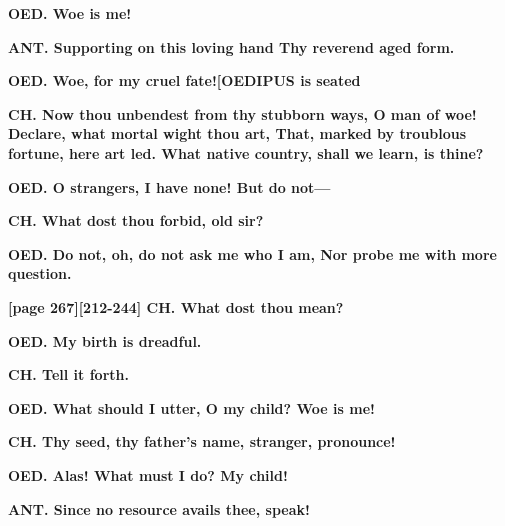 \documentclass[11pt,letter]{book}
\begin{document}
\par \textbf{OED. Woe is me!}
\par 

\par \textbf{ANT. Supporting on this loving hand Thy reverend aged form.}
\par 

\par \textbf{OED. Woe, for my cruel fate![OEDIPUS is seated}
\par 

\par \textbf{CH. Now thou unbendest from thy stubborn ways, O man of woe! Declare, what mortal wight thou art, That, marked by troublous fortune, here art led. What native country, shall we learn, is thine?}
\par 

\par \textbf{OED. O strangers, I have none! But do not—}
\par 

\par \textbf{CH. What dost thou forbid, old sir?}
\par 

\par \textbf{OED. Do not, oh, do not ask me who I am, Nor probe me with more question.}
\par 

\par \textbf{[page 267][212-244] CH. What dost thou mean?}
\par 

\par \textbf{OED. My birth is dreadful.}
\par 

\par \textbf{CH. Tell it forth.}
\par 

\par \textbf{OED. What should I utter, O my child? Woe is me!}
\par 

\par \textbf{CH. Thy seed, thy father’s name, stranger, pronounce!}
\par 

\par \textbf{OED. Alas! What must I do? My child!}
\par 

\par \textbf{ANT. Since no resource avails thee, speak!}
\par 
\end{document}
